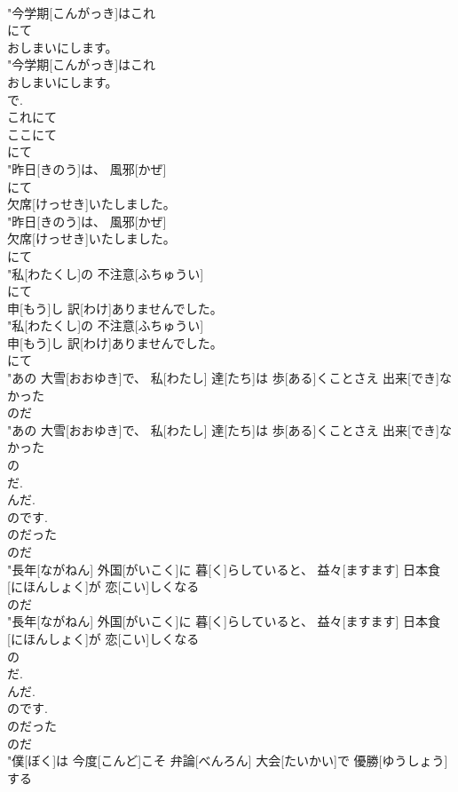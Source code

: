 \documentclass[8pt]{extreport}
\begin{document}
\begin{CJK}{UTF8}{min}
\\	"今学期[こんがっき]はこれ
\\	にて
\\	おしまいにします。
\\	"今学期[こんがっき]はこれ
\\	おしまいにします。
\\	で. 
\\	これにて 
\\	ここにて 
\\	にて
\\	"昨日[きのう]は、 風邪[かぜ]
\\	にて
\\	欠席[けっせき]いたしました。
\\	"昨日[きのう]は、 風邪[かぜ]
\\	欠席[けっせき]いたしました。
\\	にて
\\	"私[わたくし]の 不注意[ふちゅうい]
\\	にて
\\	申[もう]し 訳[わけ]ありませんでした。
\\	"私[わたくし]の 不注意[ふちゅうい]
\\	申[もう]し 訳[わけ]ありませんでした。
\\	にて
\\	"あの 大雪[おおゆき]で、 私[わたし] 達[たち]は 歩[ある]くことさえ 出来[でき]なかった
\\	のだ
\\	"あの 大雪[おおゆき]で、 私[わたし] 達[たち]は 歩[ある]くことさえ 出来[でき]なかった
\\	の 
\\	だ. 
\\	んだ. 
\\	のです. 
\\	のだった	
\\	のだ
\\	"長年[ながねん] 外国[がいこく]に 暮[く]らしていると、 益々[ますます] 日本食[にほんしょく]が 恋[こい]しくなる
\\	のだ
\\	"長年[ながねん] 外国[がいこく]に 暮[く]らしていると、 益々[ますます] 日本食[にほんしょく]が 恋[こい]しくなる
\\	の 
\\	だ. 
\\	んだ. 
\\	のです. 
\\	のだった	
\\	のだ
\\	"僕[ぼく]は 今度[こんど]こそ 弁論[べんろん] 大会[たいかい]で 優勝[ゆうしょう]する

\end{CJK}
\end{document}
